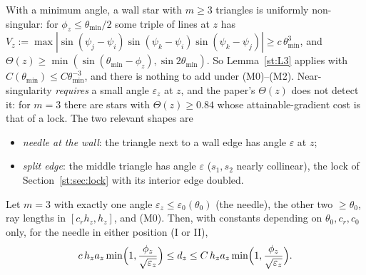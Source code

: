 With a minimum angle, a wall star with $m\ge3$ triangles is uniformly non-singular: for $\phi_z\le\theta_{\min}/2$ some triple of lines at $z$ has $V_z:=\max|\sin(\psi_j-\psi_i)\sin(\psi_k-\psi_i)\sin(\psi_k-\psi_j)|\ge c\,\theta_{\min}^3$, and $\Theta(z)\ge\min(\sin(\theta_{\min}-\phi_z),\sin2\theta_{\min})$. So Lemma~\ref{st:L3} applies with $C(\theta_{\min})\le C\theta_{\min}^{-3}$, and there is nothing to add under (M0)--(M2). Near-singularity \emph{requires} a small angle $\varepsilon_z$ at $z$, and the paper's $\Theta(z)$ does not detect it: for $m=3$ there are stars with $\Theta(z)\ge0.84$ whose attainable-gradient cost is that of a lock. The two relevant shapes are
\begin{itemize}
\item[I] \emph{needle at the wall}: the triangle next to a wall edge has angle $\varepsilon$ at $z$;
\item[II] \emph{split edge}: the middle triangle has angle $\varepsilon$ ($s_1,s_2$ nearly collinear), the lock of Section~\ref{st:sec:lock} with its interior edge doubled.
\end{itemize}

\begin{theorem}\label{st:N2}
Let $m=3$ with exactly one angle $\varepsilon_z\le\varepsilon_0(\theta_0)$ (the needle), the other two $\ge\theta_0$, ray lengths in $[c_rh_z,h_z]$, and (M0). Then, with constants depending on $\theta_0,c_r,c_0$ only, for the needle in either position (I or II),
\[
c\,h_za_z\min\Bigl(1,\frac{\phi_z}{\sqrt{\varepsilon_z}}\Bigr)\le d_z\le C\,h_za_z\min\Bigl(1,\frac{\phi_z}{\sqrt{\varepsilon_z}}\Bigr).
\]
\end{theorem}

